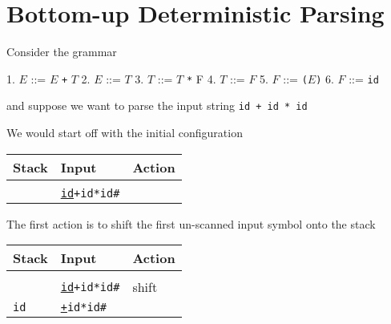\documentclass[8pt,a4paper,compress,handout]{beamer}
\newcommand{\mm}[1]{$#1$}
\newenvironment{spaced}
{
\smallskip
\hspace{.5cm}
\begin{minipage}[c]{\textwidth}
}
{
\end{minipage}
\smallskip
}
\begin{document}
\section{Bottom-up Deterministic Parsing}
\begin{frame}[fragile]
\pause

Consider the grammar

\text{ }
\begin{spaced}
\begin{production}
1. \mm{E} ::= \mm{E} \lstinline{+} \mm{T}
2. \mm{E} ::= \mm{T}
3. \mm{T} ::= \mm{T} \lstinline{*} {F}
4. \mm{T} ::= \mm{F}
5. \mm{F} ::= \lstinline{(}\mm{E}\lstinline{)}
6. \mm{F} ::= \lstinline{id}
\end{production}
\end{spaced}


and suppose we want to parse the input string \lstinline{id + id * id}

\pause
\bigskip

We would start off with the initial configuration 

\begin{table}[H]
\begin{tabular}{lll}
Stack & Input & Action \\ \hline \\
& \underline{\lstinline$id$}\lstinline$+id*id#$ &
\end{tabular}
\end{table}

\pause
\bigskip

The first action is to shift the first un-scanned input symbol onto the stack

\begin{table}[H]
\begin{tabular}{lll}
Stack & Input & Action \\ \hline \\
& \underline{\lstinline$id$}\lstinline$+id*id#$ & shift \\
\lstinline$id$ & \underline{\lstinline$+$}\lstinline$id*id#$ &
\end{tabular}
\end{table}
\end{frame}
\end{document}
